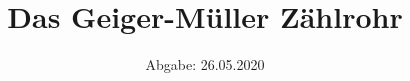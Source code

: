 

\subject{Versuch V703}
\title{Das Geiger-Müller Zählrohr}
\date{%
  Abgabe: 26.05.2020
}



\maketitle
\thispagestyle{empty}
\tableofcontents
\newpage






\newpage
\printbibliography{}


